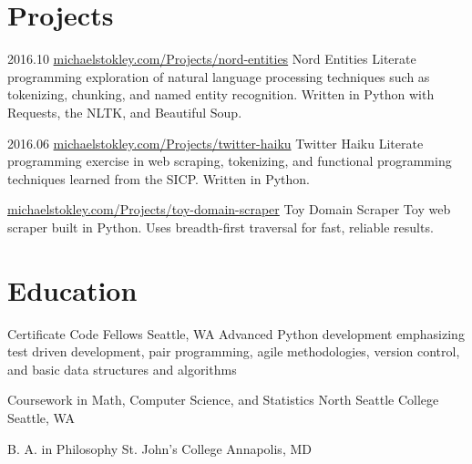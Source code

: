 \documentclass[10pt,a4paper,sans]{moderncv}        %
\begin{document}
\section{Projects}

\begin{comment}

  \cventry
  {date}
  {github url}
  {name}
  {}
  {}
  {description}

\end{comment}

\cventry
{2016.10}
{\href{http://michaelstokley.com/Projects/nord-entities}{michaelstokley.com/Projects/nord-entities}}
{Nord Entities}
{}
{}
{Literate programming exploration of natural language processing techniques such as
  tokenizing, chunking, and named entity recognition. Written in Python with
  Requests, the NLTK, and Beautiful Soup.
}

\cventry
{2016.06}
{\href{http://michaelstokley.com/Projects/twitter-haiku}{michaelstokley.com/Projects/twitter-haiku}}
{Twitter Haiku}
{}
{}
{Literate programming exercise in web scraping, tokenizing, and functional
  programming techniques learned from the SICP. Written in Python.
}

{\href{http://michaelstokley.com/Projects/toy-domain-scraper}{michaelstokley.com/Projects/toy-domain-scraper}}
{Toy Domain Scraper} {} {} {Toy web scraper built in Python. Uses breadth-first
  traversal for fast, reliable results.
}

\begin{comment}
  \cventry {2016.04}
  {\href{http://github.com/TeamReciprocity/reciprocity}{github.com/TeamReciprocity/reciprocity}}
  {Reciprocity} {} {} {A full stack Python web application for recipe sharing and
    collaboration. Built with Django and PostgreSQL, deployed via Ansible to an
    AWS EC2 instance.
  }
\end{comment}

\begin{comment}
  \cventry {2016.04}
  {\href{https://github.com/homequest/homequest}{github.com/homequest/homequest}}
  {HomeQuest} {} {} {A full-stack Python web application to gamify household
    chores and chore management. Manually implemented authorization,
    authentication, and row-level security. Built in Pyramid with a PostgreSQL
    database and deployed on Heroku.
  }
\end{comment}

\section{Education}
 {Certificate} {Code Fellows} {Seattle, WA} {} {Advanced Python development emphasizing test driven development, pair programming, agile methodologies, version control, and basic data structures and algorithms}

 {Coursework in Math, Computer Science, and Statistics}
{North Seattle College} {Seattle, WA} {} {}

 {B. A. in Philosophy} {St. John's College}
{Annapolis, MD} {} {}
\end{document}
